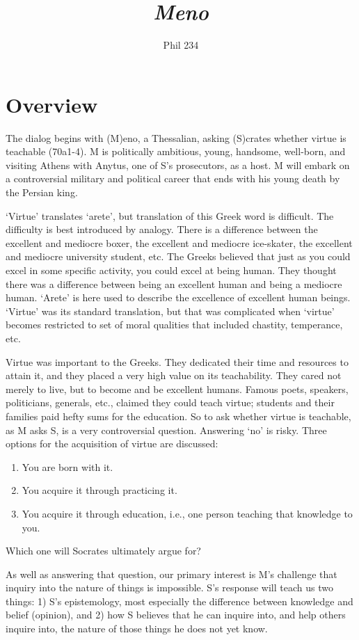 \documentclass[10 pt]{article}
\begin{document}
\author{Phil 234}
\title{\emph{Meno}}
\maketitle

\section*{Overview}
The dialog begins with (M)eno, a Thessalian, asking (S)crates whether virtue is teachable (70a1-4). M is politically ambitious, young, handsome, well-born, and visiting Athens with Anytus, one of S's prosecutors, as a host.  M will embark on a controversial military and political career that ends with his young death by the Persian king.  

`Virtue' translates `arete', but translation of this Greek word is difficult. The difficulty is best introduced by analogy. There is a difference between the excellent and mediocre boxer, the excellent and mediocre ice-skater, the excellent and mediocre university student, etc. The Greeks believed that just as you could excel in some specific activity, you could excel at being human. They thought there was a difference between being an excellent human and being a mediocre human. `Arete' is here used to describe the excellence of excellent human beings. `Virtue' was its standard translation, but that was complicated when `virtue' becomes restricted to set of moral qualities that included chastity, temperance, etc.

Virtue was important to the Greeks. They dedicated their time and resources to attain it, and they placed a very high value on its teachability. They cared not merely to live, but to become and be excellent humans. Famous poets, speakers, politicians, generals, etc., claimed they could teach virtue; students and their families paid hefty sums for the education. So to ask whether virtue is teachable, as M asks S, is a very controversial question. Answering `no' is risky.  Three options for the acquisition of virtue are discussed: 
\begin{enumerate}
\item You are born with it. 
\item You acquire it through practicing it. 
\item You acquire it through education, i.e., one person teaching that knowledge to you. 
\end{enumerate}
Which one will Socrates ultimately argue for? 

As well as answering that question, our primary interest is M's challenge that inquiry into the nature of things is impossible. S's response will teach us two things: 1) S's epistemology, most especially the difference between knowledge and belief (opinion), and 2) how S believes that he can inquire into, and help others inquire into, the nature of those things he does not yet know. 
\end{document}
